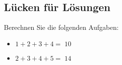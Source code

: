 \documentclass[]{article}
\providecommand{\tightlist}{%
  \setlength{\itemsep}{0pt}\setlength{\parskip}{0pt}}
\begin{document}
\hypertarget{lucken-fur-losungen}{%
\subsection{Lücken für Lösungen}\label{lucken-fur-losungen}}

Berechnen Sie die folgenden Aufgaben:

\begin{itemize}
\tightlist
\item
  \(1+2+3+4=\;\){\(10\)}
\item
  \(2+3+4+5=\;\){\(14\)}
\end{itemize}
\end{document}
